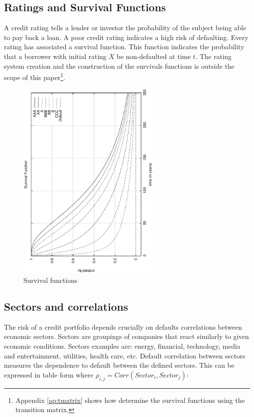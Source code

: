 \documentclass[a4paper,12pt,final]{article}
\begin{document}
\subsection{Ratings and Survival Functions}
A credit rating tells a lender or investor the probability of the subject being 
able to pay back a loan. A poor credit rating indicates a high risk of defaulting.
Every rating has associated a survival function. This function indicates the 
probability that a borrower with initial rating $X$ be non-defaulted at time $t$.
The rating system creation and the construction of the survivals functions is 
outside the scope of this paper\footnote{Appendix \ref{ap:tmatrix} shows 
how determine the survival functions using the transition matrix.}.

\begin{figure}[!hb]
\begin{center}
\includegraphics[height=10cm, angle=-90]{./images/survival.ps}
\caption{Survival functions}
\label{survival}
\end{center}
\end{figure}

\subsection{Sectors and correlations}
The risk of a credit portfolio depends crucially on defaults correlations between 
economic sectors. Sectors are groupings of companies that react similarly to 
given economic conditions. Sectors examples are: energy, financial, technology, 
media and entertainment, utilities, health care, etc. Default correlation between 
sectors measures the dependence to default between the defined sectors. This can 
be expressed in table form where 
$\rho_{i,j} = Corr(Sector_i, Sector_j)$:
\end{document}

